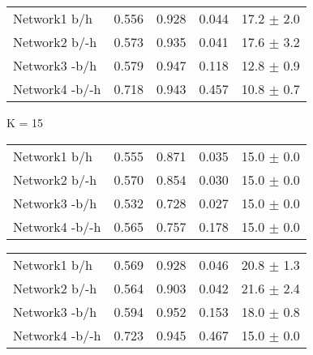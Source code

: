 \begin{table*}[h]
\begin{minipage}[h]{0.45\linewidth}
\begin{tabular}{lrrrr}
\hline
\end{tabular}
\end{minipage}
\hspace{0.8cm}
\begin{minipage}[h]{0.45\linewidth}
\begin{tabular}{lrrrr}
 Network1 b/h        &    0.556 &       0.928 &    0.044 & 17.2 $\pm$ 2.0 \\
 Network2 b/-h      &    0.573 &       0.935 &    0.041 & 17.6 $\pm$ 3.2    \\
 Network3 -b/h      &    0.579 &       0.947 &    0.118 & 12.8 $\pm$ 0.9 \\
 Network4 -b/-h      &    0.718 &       0.943 &    0.457 & 10.8 $\pm$ 0.7 \\

\hline
\end{tabular}
\end{minipage}


	\begin{minipage}[h]{0.45\linewidth} 
K = 15
\begin{tabular}{lrrrr}
 Network1 b/h          &    0.555 &       0.871 &    0.035 & 15.0 $\pm$ 0.0 \\
 Network2 b/-h        &    0.570 &       0.854 &    0.030 & 15.0 $\pm$ 0.0 \\
 Network3 -b/h        &    0.532 &       0.728 &    0.027 & 15.0 $\pm$ 0.0 \\
 Network4 -b/-h        &    0.565 &       0.757 &    0.178 & 15.0 $\pm$ 0.0 \\

\hline
\end{tabular}
\end{minipage}
\hspace{0.8cm}
\begin{minipage}[h]{0.45\linewidth}
\begin{tabular}{lrrrr}
 Network1 b/h        &    0.569 &       0.928 &    0.046 & 20.8 $\pm$ 1.3 \\
 Network2 b/-h      &    0.564 &       0.903 &    0.042 & 21.6 $\pm$ 2.4 \\
 Network3 -b/h      &    0.594 &       0.952 &    0.153 & 18.0 $\pm$ 0.8 \\
 Network4 -b/-h      &    0.723 &       0.945 &    0.467 & 15.0 $\pm$ 0.0    \\

\hline
\end{tabular}
\end{minipage}


\end{table*}
